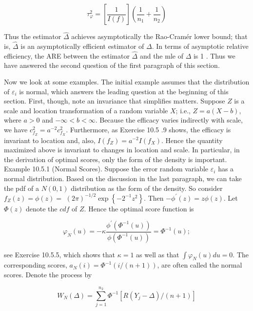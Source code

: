 \begin{equation*}
\tau_{\varphi}^{2}=\left[\frac{1}{I(f)}\right]\left(\frac{1}{n_{1}}+\frac{1}{n_{2}}\right) \tag{10.5.28}
\end{equation*}


Thus the estimator $\widehat{\Delta}$ achieves asymptotically the Rao-Cramér lower bound; that is, $\widehat{\Delta}$ is an asymptotically efficient estimator of $\Delta$. In terms of asymptotic relative efficiency, the ARE between the estimator $\widehat{\Delta}$ and the mle of $\Delta$ is 1 . Thus we have answered the second question of the first paragraph of this section.

Now we look at some examples. The initial example assumes that the distribution of $\varepsilon_{i}$ is normal, which answers the leading question at the beginning of this\\
section. First, though, note an invariance that simplifies matters. Suppose $Z$ is a scale and location transformation of a random variable $X$; i.e., $Z=a(X-b)$, where $a>0$ and $-\infty<b<\infty$. Because the efficacy varies indirectly with scale, we have $c_{f_{Z}}^{2}=a^{-2} c_{f_{X}}^{2}$. Furthermore, as Exercise 10.5 .9 shows, the efficacy is invariant to location and, also, $I\left(f_{Z}\right)=a^{-2} I\left(f_{X}\right)$. Hence the quantity maximized above is invariant to changes in location and scale. In particular, in the derivation of optimal scores, only the form of the density is important.\\
Example 10.5.1 (Normal Scores). Suppose the error random variable $\varepsilon_{i}$ has a normal distribution. Based on the discussion in the last paragraph, we can take the pdf of a $N(0,1)$ distribution as the form of the density. So consider $f_{Z}(z)=\phi(z)=$ $(2 \pi)^{-1 / 2} \exp \left\{-2^{-1} z^{2}\right\}$. Then $-\phi^{\prime}(z)=z \phi(z)$. Let $\Phi(z)$ denote the $c d f$ of $Z$. Hence the optimal score function is


\begin{equation*}
\varphi_{N}(u)=-\kappa \frac{\phi^{\prime}\left(\Phi^{-1}(u)\right)}{\phi\left(\Phi^{-1}(u)\right)}=\Phi^{-1}(u) ; \tag{10.5.29}
\end{equation*}


see Exercise 10.5.5, which shows that $\kappa=1$ as well as that $\int \varphi_{N}(u) d u=0$. The corresponding scores, $a_{N}(i)=\Phi^{-1}(i /(n+1))$, are often called the normal scores. Denote the process by


\begin{equation*}
W_{N}(\Delta)=\sum_{j=1}^{n_{2}} \Phi^{-1}\left[R\left(Y_{j}-\Delta\right) /(n+1)\right] \tag{10.5.30}
\end{equation*}


